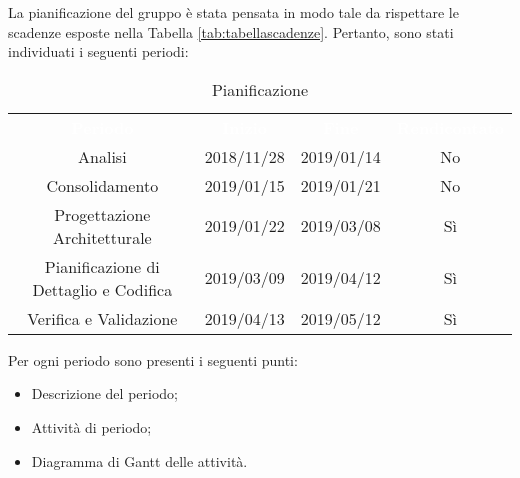 La pianificazione del gruppo \gruppo \space è stata pensata in modo tale da rispettare le scadenze esposte nella Tabella \ref{tab:tabellascadenze}.\newline
Pertanto, sono stati individuati i seguenti periodi:

\renewcommand{\arraystretch}{1.5}
\begin{table}[H]	
	\begin{center}
	    \begin{tabular}{ c  c  c  c }
	        \rowcolor{greySWEight}
	        \textcolor{white}{\textbf{Periodo}} & \textcolor{white}{\textbf{Inizio}}& \textcolor{white}{\textbf{Fine}}&\textcolor{white}{\textbf{Rendicontato}}\\
	        Analisi & 2018/11/28 & 2019/01/14&No\\
	        Consolidamento & 2019/01/15 & 2019/01/21&No\\
	        Progettazione Architetturale & 2019/01/22 & 2019/03/08&Sì\\
	        Pianificazione di Dettaglio e Codifica & 2019/03/09 & 2019/04/12&Sì\\
	        Verifica e Validazione & 2019/04/13 & 2019/05/12&Sì\\
	    \end{tabular}
	    \caption{Pianificazione} \label{tab:pianificazione} 
	\end{center}
\end{table}


Per ogni periodo sono presenti i seguenti punti:
\begin{itemize}
	\item Descrizione del {periodo};
	\item Attività di periodo;
	\item {Diagramma di Gantt} delle attività.
\end{itemize}